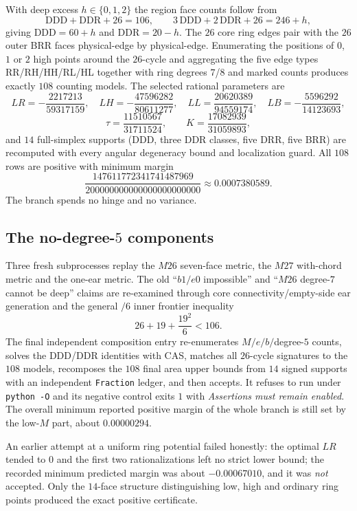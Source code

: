 With deep excess $h\in\{0,1,2\}$ the region face counts follow from
\[
\mathrm{DDD}+\mathrm{DDR}+26=106,\qquad 3\,\mathrm{DDD}+2\,\mathrm{DDR}+26=246+h,
\]
giving $\mathrm{DDD}=60+h$ and $\mathrm{DDR}=20-h$. The $26$ core ring edges pair with the $26$ outer
BRR faces physical-edge by physical-edge. Enumerating the positions of $0$, $1$ or $2$ high points
around the $26$-cycle and aggregating the five edge types RR/RH/HH/RL/HL together with ring degrees
$7$/$8$ and marked counts produces exactly $108$ counting models. The selected rational parameters
are
\[
LR=-\frac{2217213}{59317159},\quad LH=-\frac{47596282}{80611277},\quad
LL=\frac{20620389}{94559174},\quad LB=-\frac{5596292}{14123693},
\]
\[
\tau=\frac{11510567}{31711524},\qquad K=\frac{17082939}{31059893},
\]
and $14$ full-simplex supports (DDD, three DDR classes, five DRR, five BRR) are recomputed with
every angular degeneracy bound and localization guard. All $108$ rows are positive with minimum
margin
\[
\frac{147611772341741487969}{200000000000000000000000}\approx0.0007380589 .
\]
The branch spends no hinge and no variance.

\subsection{The no-degree-$5$ components}

Three fresh subprocesses replay the $M26$ seven-face metric, the $M27$ with-chord metric and the
one-ear metric. The old ``$b1/e0$ impossible'' and ``$M26$ degree-$7$ cannot be deep'' claims are
re-examined through core connectivity/empty-side ear generation and the general $/6$ inner frontier
inequality
\[
26+19+\frac{19^2}{6}<106 .
\]
The final independent composition entry re-enumerates $M/e/b/$degree-$5$ counts, solves the
DDD/DDR identities with CAS, matches all $26$-cycle signatures to the $108$ models, recomposes the
$108$ final area upper bounds from $14$ signed supports with an independent \texttt{Fraction}
ledger, and then accepts. It refuses to run under \texttt{python -\allowbreak{}O} and its negative control exits
$1$ with \emph{Assertions must remain enabled}. The overall minimum reported positive margin of the
whole branch is still set by the low-$M$ part, about $0.00000294$.

An earlier attempt at a uniform ring potential failed honestly: the optimal $LR$ tended to $0$ and
the first two rationalizations left no strict lower bound; the recorded minimum predicted margin was
about $-0.00067010$, and it was \emph{not} accepted. Only the $14$-face structure distinguishing low,
high and ordinary ring points produced the exact positive certificate.

